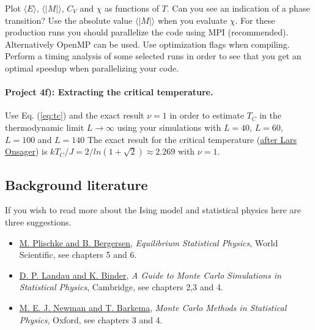 \documentclass[%
oneside,                 %
final,                   %
10pt]{article}
\begin{document}
Plot $\langle E\rangle$,
$\langle \vert M\vert\rangle$, $C_V$ and $\chi$ as functions of $T$. Can
you see an indication of a phase transition?  Use the absolute value
$\langle \vert M\vert\rangle$ when you evaluate $\chi$.  For these production runs you should
parallelize the code using MPI (recommended). Alternatively OpenMP can be used. Use optimization flags when compiling. Perform a timing analysis of some selected runs in order to see that you get an optimal speedup when parallelizing your code. 



\paragraph{Project 4f): Extracting the critical temperature.}
Use Eq. (\ref{eq:tc}) and the exact result
$\nu=1$ in order to estimate $T_C$ in the thermodynamic limit 
$L\rightarrow \infty$
using your simulations with $L=40$, $L=60$, $L=100$ and $L=140$
The exact result for the critical temperature (\href{{http://journals.aps.org/pr/abstract/10.1103/PhysRev.65.117}}{after Lars Onsager}) is
$kT_C/J=2/ln(1+\sqrt{2})\approx 2.269$ with $\nu=1$.

\subsection{Background literature}

If you wish to read more about the Ising model and statistical physics here are three suggestions.

\begin{itemize}
  \item \href{{http://www.worldscientific.com/worldscibooks/10.1142/5660}}{M. Plischke and B. Bergersen}, \emph{Equilibrium Statistical Physics}, World Scientific, see chapters 5 and 6.

  \item \href{{http://www.cambridge.org/no/academic/subjects/physics/computational-science-and-modelling/guide-monte-carlo-simulations-statistical-physics-4th-edition?format=HB}}{D. P. Landau and K. Binder}, \emph{A Guide to Monte Carlo Simulations in Statistical Physics}, Cambridge, see chapters 2,3 and 4.

  \item \href{{https://global.oup.com/academic/product/monte-carlo-methods-in-statistical-physics-9780198517979?cc=no&lang=en&}}{M. E. J. Newman and T. Barkema}, \emph{Monte Carlo Methods in Statistical Physics}, Oxford, see chapters 3 and 4.
\end{itemize}
\end{document}
